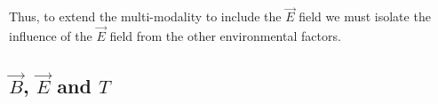 Thus, to extend the multi-modality to include the $\vec{E}$ field we must isolate the influence of the $\vec{E}$ field from the other environmental factors. 


\lipsum[1-4]

\subsection{$\vec{B}$, $\vec{E}$ and $T$}
\lipsum[1-8]
%
%
%
%
%
%
